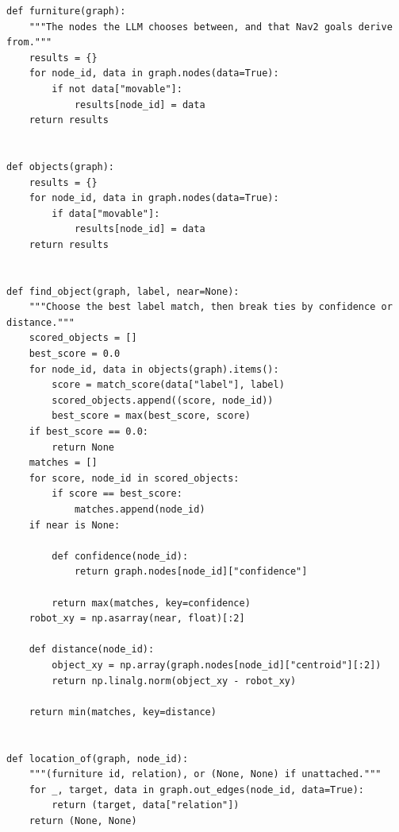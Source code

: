 \documentclass[11pt,a4paper]{book}
\begin{document}
\begin{lstlisting}
def furniture(graph):
    """The nodes the LLM chooses between, and that Nav2 goals derive from."""
    results = {}
    for node_id, data in graph.nodes(data=True):
        if not data["movable"]:
            results[node_id] = data
    return results


def objects(graph):
    results = {}
    for node_id, data in graph.nodes(data=True):
        if data["movable"]:
            results[node_id] = data
    return results


def find_object(graph, label, near=None):
    """Choose the best label match, then break ties by confidence or distance."""
    scored_objects = []
    best_score = 0.0
    for node_id, data in objects(graph).items():
        score = match_score(data["label"], label)
        scored_objects.append((score, node_id))
        best_score = max(best_score, score)
    if best_score == 0.0:
        return None
    matches = []
    for score, node_id in scored_objects:
        if score == best_score:
            matches.append(node_id)
    if near is None:

        def confidence(node_id):
            return graph.nodes[node_id]["confidence"]

        return max(matches, key=confidence)
    robot_xy = np.asarray(near, float)[:2]

    def distance(node_id):
        object_xy = np.array(graph.nodes[node_id]["centroid"][:2])
        return np.linalg.norm(object_xy - robot_xy)

    return min(matches, key=distance)


def location_of(graph, node_id):
    """(furniture id, relation), or (None, None) if unattached."""
    for _, target, data in graph.out_edges(node_id, data=True):
        return (target, data["relation"])
    return (None, None)



\end{lstlisting}
\end{document}
